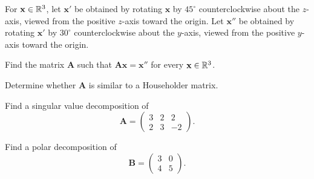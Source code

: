 \documentclass[11pt,oneside]{article}
\begin{document}
\begin{problem}
For $\mathbf x\in\mathbb{R}^3$, let $\mathbf x'$ be obtained by rotating $\mathbf x$ by $45^\circ$ counterclockwise about the $z$-axis, viewed from the positive $z$-axis toward the origin. Let $\mathbf x''$ be obtained by rotating $\mathbf x'$ by $30^\circ$ counterclockwise about the $y$-axis, viewed from the positive $y$-axis toward the origin.
\begin{problemsubparts}
\item Find the matrix $\mathbf A$ such that $\mathbf A\mathbf x=\mathbf x''$ for every $\mathbf x\in\mathbb{R}^3$.
\item Determine whether $\mathbf A$ is similar to a Householder matrix.
\end{problemsubparts}
\end{problem}

\begin{problem}
\begin{problemsubparts}
\item Find a singular value decomposition of
\[
\mathbf A=
\begin{pmatrix}
3&2&2\\
2&3&-2
\end{pmatrix}.
\]
\item Find a polar decomposition of
\[
\mathbf B=
\begin{pmatrix}
3&0\\
4&5
\end{pmatrix}.
\]
\end{problemsubparts}
\end{problem}
\end{document}
